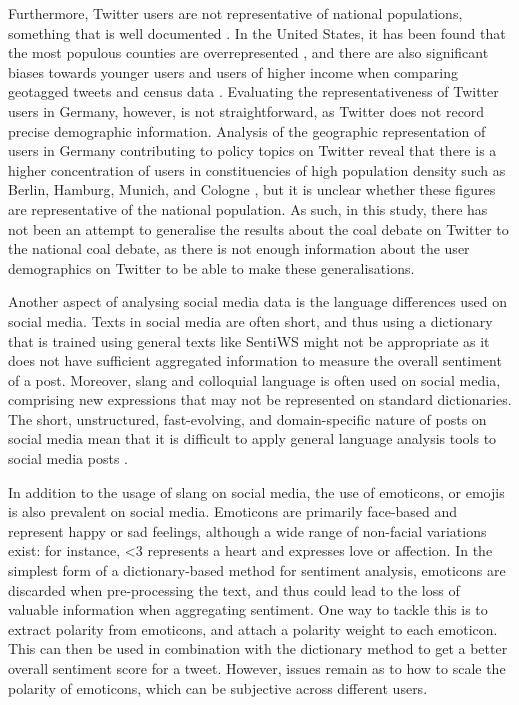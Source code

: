 \documentclass[12pt,onecolumn,twoside]{layout}
\begin{document}
Furthermore, Twitter users are not representative of national populations, something that is well documented \citep{Duggan2015, Mislove2011, Malik2015}. In the United States, it has been found that the most populous counties are overrepresented \citep{Mislove2011}, and there are also significant biases towards younger users and users of higher income when comparing geotagged tweets and census data \citep{Malik2015}. Evaluating the representativeness of Twitter users in Germany, however, is not straightforward, as Twitter does not record precise demographic information. Analysis of the geographic representation of users in Germany contributing to policy topics on Twitter reveal that there is a higher concentration of users in constituencies of high population density such as Berlin, Hamburg, Munich, and Cologne \citep{Fernandez2014}, but it is unclear whether these figures are representative of the national population. As such, in this study, there has not been an attempt to generalise the results about the coal debate on Twitter to the national coal debate, as there is not enough information about the user demographics on Twitter to be able to make these generalisations.

Another aspect of analysing social media data is the language differences used on social media. Texts in social media are often short, and thus using a dictionary that is trained using general texts like SentiWS might not be appropriate as it does not have sufficient aggregated information to measure the overall sentiment of a post. Moreover, slang and colloquial language is often used on social media, comprising new expressions that may not be represented on standard dictionaries. The short, unstructured, fast-evolving, and domain-specific nature of posts on social media mean that it is difficult to apply general language analysis tools to social media posts \citep{Hu2013}.

In addition to the usage of slang on social media, the use of emoticons, or emojis is also prevalent on social media. Emoticons are primarily face-based and represent happy or sad feelings, although a wide range of non-facial variations exist: for instance, <3 represents a heart and expresses love or affection. In the simplest form of a dictionary-based method for sentiment analysis, emoticons are discarded when pre-processing the text, and thus could lead to the loss of valuable information when aggregating sentiment. One way to tackle this is to extract polarity from emoticons, and attach a polarity weight to each emoticon. This can then be used in combination with the dictionary method to get a better overall sentiment score for a tweet. However, issues remain as to how to scale the polarity of emoticons, which can be subjective across different users.
\end{document}
